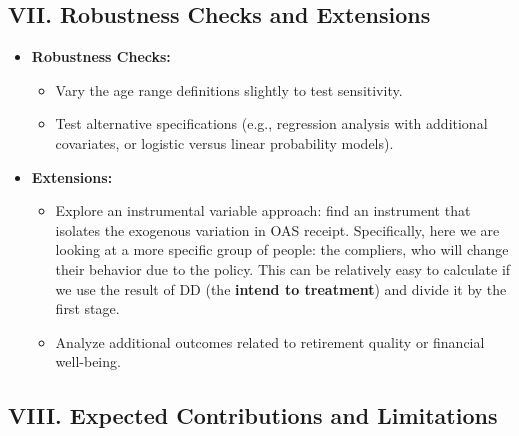 \documentclass[
]{article}
\providecommand{\tightlist}{%
  \setlength{\itemsep}{0pt}\setlength{\parskip}{0pt}}
\begin{document}
\subsection{VII. Robustness Checks and
Extensions}\label{vii.-robustness-checks-and-extensions}

\begin{itemize}
\tightlist
\item
  \textbf{Robustness Checks:}

  \begin{itemize}
  \tightlist
  \item
    Vary the age range definitions slightly to test sensitivity.
  \item
    Test alternative specifications (e.g., regression analysis with
    additional covariates, or logistic versus linear probability
    models).
  \end{itemize}
\item
  \textbf{Extensions:}

  \begin{itemize}
  \tightlist
  \item
    Explore an instrumental variable approach: find an instrument that
    isolates the exogenous variation in OAS receipt. Specifically, here
    we are looking at a more specific group of people: the compliers,
    who will change their behavior due to the policy. This can be
    relatively easy to calculate if we use the result of DD (the
    \textbf{intend to treatment}) and divide it by the first stage.
  \item
    Analyze additional outcomes related to retirement quality or
    financial well-being.
  \end{itemize}
\end{itemize}

\subsection{VIII. Expected Contributions and
Limitations}\label{viii.-expected-contributions-and-limitations}
\end{document}
